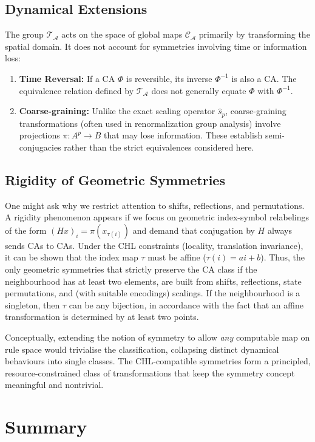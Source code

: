\documentclass[a4paper]{article}
\begin{document}
\subsection{Dynamical Extensions}
The group $\mathcal{T}_{\mathcal{A}}$ acts on the space of global maps $\mathcal{C}_{\mathcal{A}}$ primarily by transforming the spatial domain. It does not account for symmetries involving time or information loss:
\begin{enumerate}
    \item \textbf{Time Reversal:} If a CA $\Phi$ is reversible, its inverse $\Phi^{-1}$ is also a CA. The equivalence relation defined by $\mathcal{T}_{\mathcal{A}}$ does not generally equate $\Phi$ with $\Phi^{-1}$.
    \item \textbf{Coarse-graining:} Unlike the exact scaling operator $\hat{s}_p$, coarse-graining transformations (often used in renormalization group analysis) involve projections $\pi: A^p \to B$ that may lose information. These establish semi-conjugacies rather than the strict equivalences considered here.
\end{enumerate}

\subsection{Rigidity of Geometric Symmetries}
One might ask why we restrict attention to shifts, reflections, and permutations. A rigidity phenomenon appears if we focus on geometric index-symbol relabelings of the form $(Hx)_i = \pi(x_{\tau(i)})$ and demand that conjugation by $H$ always sends CAs to CAs. Under the CHL constraints (locality, translation invariance), it can be shown that the index map $\tau$ must be affine ($\tau(i) = ai+b$).
Thus, the only geometric symmetries that strictly preserve the CA class
if the neighbourhood has at least two elements, are built from shifts, reflections, state permutations, and (with suitable encodings) scalings.
If the neighbourhood is a singleton, then $\tau$ can be any bijection, in
accordance with the fact that an affine transformation is determined by at least two points.

Conceptually, extending the notion of symmetry to allow \emph{any} computable map on rule space would trivialise the classification, collapsing distinct dynamical behaviours into single classes. The CHL-compatible symmetries form a principled, resource-constrained class of transformations that keep the symmetry concept meaningful and nontrivial.

\section{Summary}
\label{sec:sum}
\end{document}
